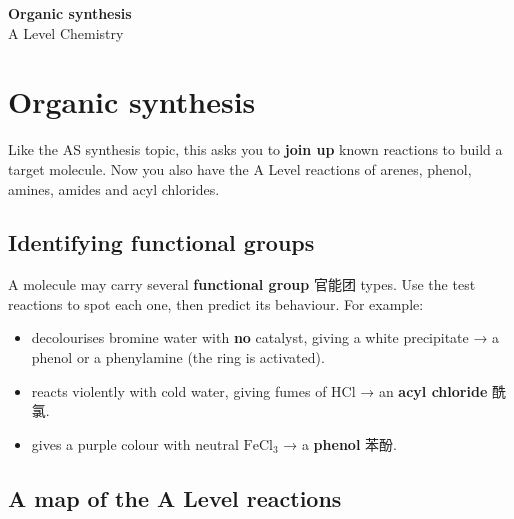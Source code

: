 \documentclass[11pt]{article}
\begin{document}
\begin{center}
  {\LARGE\bfseries Organic synthesis}\\[0.35em]
  {\large A Level Chemistry}
\end{center}
\vspace{0.6em}

\section*{Organic synthesis}

Like the AS synthesis topic, this asks you to \textbf{join up} known reactions to build a target molecule. Now you also have the A Level reactions of arenes, phenol, amines, amides and acyl chlorides.

\subsection*{Identifying functional groups}

A molecule may carry several \textbf{functional group} 官能团 types. Use the test reactions to spot each one, then predict its behaviour. For example:

\begin{itemize}
\item decolourises bromine water with \textbf{no} catalyst, giving a white precipitate → a phenol or a phenylamine (the ring is activated).

\item reacts violently with cold water, giving fumes of $\text{HCl}$ → an \textbf{acyl chloride} 酰氯.

\item gives a purple colour with neutral $\text{FeCl}_3$ → a \textbf{phenol} 苯酚.

\end{itemize}

\subsection*{A map of the A Level reactions}
\end{document}
